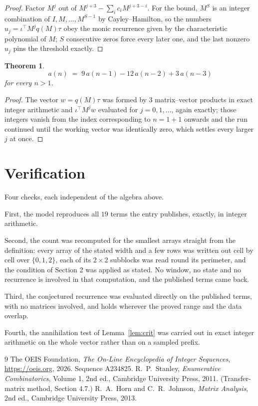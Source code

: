 \documentclass[11pt,a4paper]{article}
\theoremstyle{plain}
\newtheorem{theorem}{Theorem}
\theoremstyle{definition}
\begin{document}
\begin{proof}
Factor $M^{j}$ out of $M^{j+3}-\sum_ic_iM^{j+3-i}$. For the bound, $M^{S}$
is an integer combination of $I,M,\dots,M^{S-1}$ by Cayley--Hamilton, so the numbers
$u_j=\iota^{\!\top}M^{j}q(M)\tau$ obey the monic recurrence given by the characteristic
polynomial of $M$; $S$ consecutive zeros force every later one, and the last nonzero $u_j$
pins the threshold exactly.
\end{proof}

\begin{theorem}
\[
a(n)\;=\;9\,a(n-1) - 12\,a(n-2) + 3\,a(n-3)
\]
for every $n>1$.
\end{theorem}

\begin{proof}
The vector $w=q(M)\tau$ was formed by $3$ matrix--vector products in exact integer
arithmetic and $\iota^{\!\top}M^{j}w$ evaluated for $j=0,1,\dots$, again exactly; those
integers vanish from the index corresponding to $n=1+1$ onwards and the run continued
until the working vector was identically zero, which settles every larger $j$ at once.
\end{proof}

\section{Verification}

Four checks, each independent of the algebra above.

First, the model reproduces all $19$ terms the entry publishes, exactly, in integer
arithmetic.

Second, the count was recomputed for the smallest arrays straight from the definition: every
array of the stated width and a few rows was written out cell by cell over $\{0,1,2\}$, each of
its $2\times2$ subblocks was read round its perimeter, and the condition of Section 2 was
applied as stated. No window, no state and no recurrence is involved in that computation, and
the published terms came back.

Third, the conjectured recurrence was evaluated directly on the published terms, with no
matrices involved, and holds wherever the proved range and the data overlap.

Fourth, the annihilation test of Lemma~\ref{lem:crit} was carried out in exact integer
arithmetic on the whole vector rather than on a sampled prefix.

\begin{thebibliography}{9}
 The OEIS Foundation, \emph{The On-Line Encyclopedia of Integer
Sequences}, \url{https://oeis.org}, 2026. Sequence A234825.
 R.~P.~Stanley, \emph{Enumerative Combinatorics}, Volume 1, 2nd ed.,
Cambridge University Press, 2011. (Transfer-matrix method, Section 4.7.)
 R.~A.~Horn and C.~R.~Johnson, \emph{Matrix Analysis}, 2nd ed., Cambridge
University Press, 2013.
\end{thebibliography}
\end{document}
